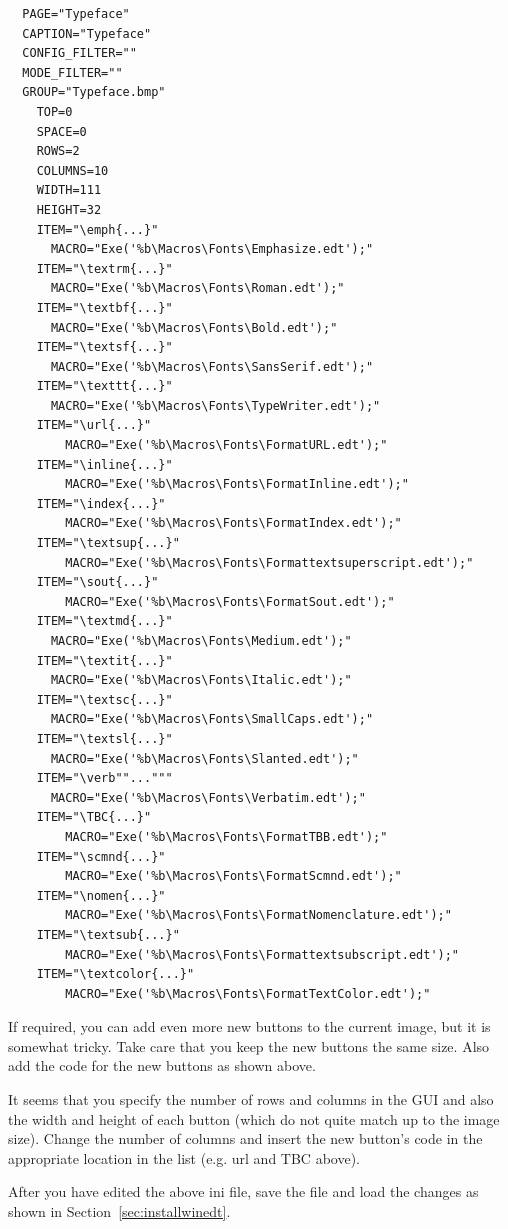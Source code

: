 \begin{lstlisting}
  PAGE="Typeface"
  CAPTION="Typeface"
  CONFIG_FILTER=""
  MODE_FILTER=""
  GROUP="Typeface.bmp"
    TOP=0
    SPACE=0
    ROWS=2
    COLUMNS=10
    WIDTH=111
    HEIGHT=32
    ITEM="\emph{...}"
      MACRO="Exe('%b\Macros\Fonts\Emphasize.edt');"
    ITEM="\textrm{...}"
      MACRO="Exe('%b\Macros\Fonts\Roman.edt');"
    ITEM="\textbf{...}"
      MACRO="Exe('%b\Macros\Fonts\Bold.edt');"
    ITEM="\textsf{...}"
      MACRO="Exe('%b\Macros\Fonts\SansSerif.edt');"
    ITEM="\texttt{...}"
      MACRO="Exe('%b\Macros\Fonts\TypeWriter.edt');"
    ITEM="\url{...}"
        MACRO="Exe('%b\Macros\Fonts\FormatURL.edt');"
    ITEM="\inline{...}"
        MACRO="Exe('%b\Macros\Fonts\FormatInline.edt');"
    ITEM="\index{...}"
        MACRO="Exe('%b\Macros\Fonts\FormatIndex.edt');"
    ITEM="\textsup{...}"
        MACRO="Exe('%b\Macros\Fonts\Formattextsuperscript.edt');"
    ITEM="\sout{...}"
        MACRO="Exe('%b\Macros\Fonts\FormatSout.edt');"
    ITEM="\textmd{...}"
      MACRO="Exe('%b\Macros\Fonts\Medium.edt');"
    ITEM="\textit{...}"
      MACRO="Exe('%b\Macros\Fonts\Italic.edt');"
    ITEM="\textsc{...}"
      MACRO="Exe('%b\Macros\Fonts\SmallCaps.edt');"
    ITEM="\textsl{...}"
      MACRO="Exe('%b\Macros\Fonts\Slanted.edt');"
    ITEM="\verb""..."""
      MACRO="Exe('%b\Macros\Fonts\Verbatim.edt');"
    ITEM="\TBC{...}"
        MACRO="Exe('%b\Macros\Fonts\FormatTBB.edt');"
    ITEM="\scmnd{...}"
        MACRO="Exe('%b\Macros\Fonts\FormatScmnd.edt');"
    ITEM="\nomen{...}"
        MACRO="Exe('%b\Macros\Fonts\FormatNomenclature.edt');"
    ITEM="\textsub{...}"
        MACRO="Exe('%b\Macros\Fonts\Formattextsubscript.edt');"
    ITEM="\textcolor{...}"
        MACRO="Exe('%b\Macros\Fonts\FormatTextColor.edt');"
\end{lstlisting}

If required, you can add even more new buttons to the current image, but it is somewhat tricky. Take care that you keep the new buttons the same size. Also add the code for the new buttons as shown above.

It seems that you specify the number of rows and columns in the GUI and also the width and height of each button (which do not quite match up to the image size).  Change the number of columns and insert the new button's code in the appropriate location in the list (e.g. url and TBC above).

After you have edited the above ini file, save the file and load the changes as shown in Section~\ref{sec:installwinedt}.

